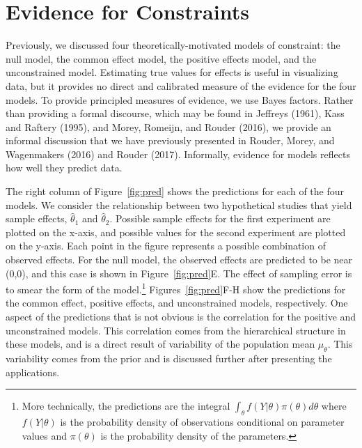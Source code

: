 \documentclass[english,man]{apa6}
\theoremstyle{definition}
\theoremstyle{definition}
\theoremstyle{definition}
\theoremstyle{remark}
\begin{document}
\section{Evidence for Constraints}\label{evidence-for-constraints}

Previously, we discussed four theoretically-motivated models of
constraint: the null model, the common effect model, the positive
effects model, and the unconstrained model. Estimating true values for
effects is useful in visualizing data, but it provides no direct and
calibrated measure of the evidence for the four models. To provide
principled measures of evidence, we use Bayes factors. Rather than
providing a formal discourse, which may be found in Jeffreys (1961),
Kass and Raftery (1995), and Morey, Romeijn, and Rouder (2016), we
provide an informal discussion that we have previously presented in
Rouder, Morey, and Wagenmakers (2016) and Rouder (2017). Informally,
evidence for models reflects how well they predict data.

The right column of Figure~\ref{fig:pred} shows the predictions for each
of the four models. We consider the relationship between two
hypothetical studies that yield sample effects, \(\hat{\theta}_1\) and
\(\hat{\theta}_2\). Possible sample effects for the first experiment are
plotted on the x-axis, and possible values for the second experiment are
plotted on the y-axis. Each point in the figure represents a possible
combination of observed effects. For the null model, the observed
effects are predicted to be near (0,0), and this case is shown in
Figure~\ref{fig:pred}E. The effect of sampling error is to smear the
form of the model.\footnote{More technically, the predictions are the
  integral \(\int_\theta f(Y|\theta)\pi(\theta)d\theta\) where
  \(f(Y|\theta)\) is the probability density of observations conditional
  on parameter values and \(\pi(\theta)\) is the probability density of
  the parameters.} Figures~\ref{fig:pred}F-H show the predictions for
the common effect, positive effects, and unconstrained models,
respectively. One aspect of the predictions that is not obvious is the
correlation for the positive and unconstrained models. This correlation
comes from the hierarchical structure in these models, and is a direct
result of variability of the population mean \(\mu_\theta\). This
variability comes from the prior and is discussed further after
presenting the applications.
\end{document}
